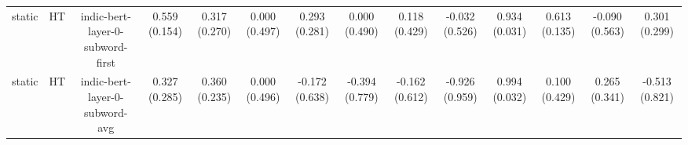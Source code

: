 \begin{sidewaystable}[htb]
\begin{tabular}{@{}cccccccccccccc@{}}
        static & HT & indic-bert-layer-0-subword-first & 0.559 (0.154) & 0.317 (0.270) & 0.000 (0.497) & 0.293 (0.281) & 0.000 (0.490) & 0.118 (0.429) & -0.032 (0.526) & 0.934 (0.031) & 0.613 (0.135) & -0.090 (0.563) & 0.301 (0.299) \\
        static & HT & indic-bert-layer-0-subword-avg & 0.327 (0.285) & 0.360 (0.235) & 0.000 (0.496) & -0.172 (0.638) & -0.394 (0.779) & -0.162 (0.612) & -0.926 (0.959) & 0.994 (0.032) & 0.100 (0.429) & 0.265 (0.341) & -0.513 (0.821) \\
        \bottomrule
    \end{tabular}
\end{sidewaystable}